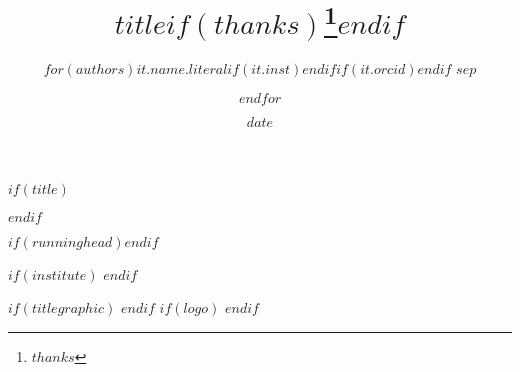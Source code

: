$if(title)$
\title{$title$$if(thanks)$\thanks{$thanks$}$endif$}
$endif$ %

\author{%
$for(authors)$$it.name.literal$$if(it.inst)$$endif$$if(it.orcid)$$endif$ $sep$ \and $endfor$%
} %

%
$if(runninghead)$$endif$

\date{$date$}

$if(institute)$
$endif$

$if(titlegraphic)$
$endif$
$if(logo)$
$endif$
